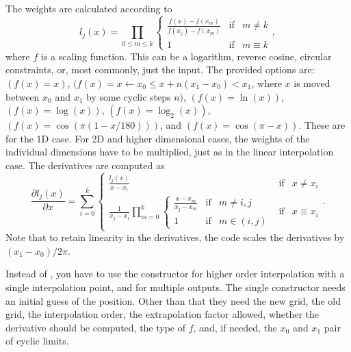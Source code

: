 The weights are calculated according to 
\begin{equation}
 l_j(x) = \prod_{0 \leq m \leq k} \left\{
 \begin{array}{lcr}
 \frac{f(x) - f(x _m)}{f(x_j) - f(x_m)} & \mathrm{if} & m \neq k \\[5pt]
 1 & \mathrm{if} & m \equiv k
 \end{array}
 \right.,
\end{equation}
where $f$ is a scaling function.  This can be a logarithm, reverse cosine,
circular constraints, or, most commonly, just the input.  The provided options
are:
 $(f(x) = x)$,
 $(f(x) = x \leftarrow x_0 \leq x + n(x_1 - x_0) < x_1$,
where $x$ is moved between $x_0$ and $x_1$ by some cyclic steps $n)$,
 $(f(x) = \ln(x))$,
 $(f(x) = \log(x))$,
 $(f(x) = \log_2(x))$,
 $(f(x) = \cos(\pi(1-x/180)))$, and
 $(f(x) = \cos(\pi-x))$.
These are for the 1D case. For 2D and higher dimensional cases, the weights of
the individual dimensions have to be multiplied, just as in the linear
interpolation case.
The derivatives are computed as
\begin{equation}
 \frac{\partial l_j(x)}{\partial x} = \sum_{i=0}^k
 \left\{
 \begin{array}{lcr}
  \frac{l_j(x)}{x - x_i} & \mathrm{if} & x \neq x_i \\
  \frac{1}{x_j - x_i} \prod_{m=0}^k
  \left\{
  \begin{array}{lcr}
   \frac{x - x_m}{x_j - x_m} & \mathrm{if} & m \neq i, j \\
   1 & \mathrm{if} & m \in (i, j)
  \end{array} \right. & \mathrm{if} & x \equiv x_i
 \end{array}
 \right..
\end{equation}
Note that to retain linearity in the derivatives, the  code
scales the derivatives by $(x_1 - x_0) / 2\pi$.

Instead of , you have to use the constructor
 for higher order interpolation
with a single interpolation point, and 
for multiple outputs. The single constructor needs an
initial guess of the position.  Other than that they need the new grid,
the old grid, the interpolation order, the extrapolation factor allowed,
whether the derivative should be computed, the type of $f$, and, if needed,
the $x_0$ and $x_1$ pair of cyclic limits.

